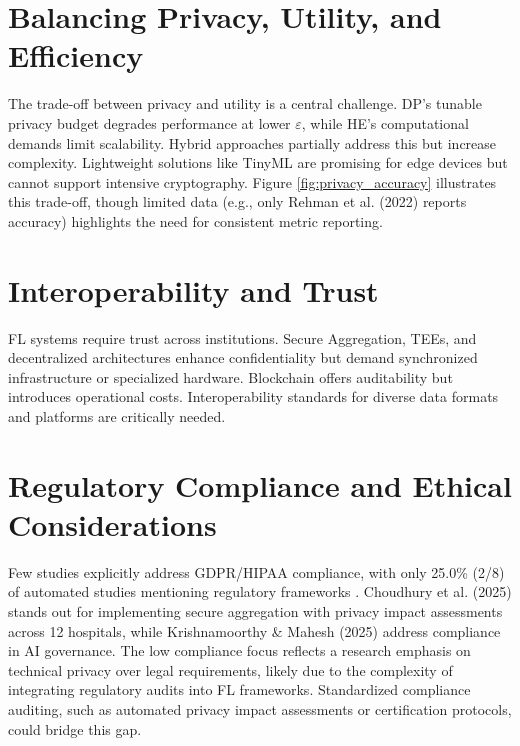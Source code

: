 \documentclass[12pt]{report}
\begin{document}
{\section{Balancing Privacy, Utility, and Efficiency}
The trade-off between privacy and utility is a central challenge. DP’s tunable privacy budget degrades performance at lower $\varepsilon$, while HE’s computational demands limit scalability. Hybrid approaches partially address this but increase complexity. Lightweight solutions like TinyML are promising for edge devices but cannot support intensive cryptography. Figure \ref{fig:privacy_accuracy} illustrates this trade-off, though limited data (e.g., only Rehman et al. (2022) \cite{rehman2022} reports accuracy) highlights the need for consistent metric reporting.

\section{Interoperability and Trust}
FL systems require trust across institutions. Secure Aggregation, TEEs, and decentralized architectures enhance confidentiality but demand synchronized infrastructure or specialized hardware. Blockchain offers auditability but introduces operational costs. Interoperability standards for diverse data formats and platforms are critically needed.

\section{Regulatory Compliance and Ethical Considerations}
Few studies explicitly address GDPR/HIPAA compliance, with only 25.0\% (2/8) of automated studies mentioning regulatory frameworks \cite{alo2025}. Choudhury et al. (2025) \cite{choudhury2025} stands out for implementing secure aggregation with privacy impact assessments across 12 hospitals, while Krishnamoorthy \& Mahesh (2025) \cite{krishnamoorthy2025} address compliance in AI governance. The low compliance focus reflects a research emphasis on technical privacy over legal requirements, likely due to the complexity of integrating regulatory audits into FL frameworks. Standardized compliance auditing, such as automated privacy impact assessments or certification protocols, could bridge this gap.

}
\end{document}
